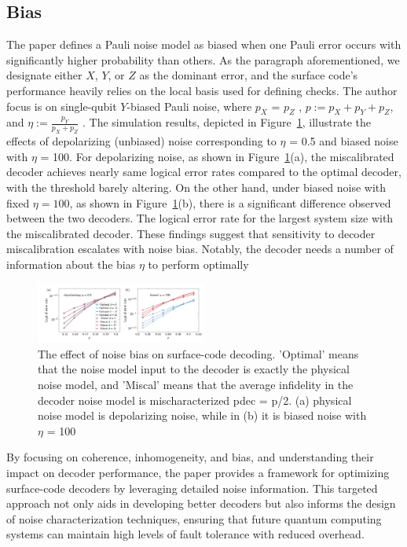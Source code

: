 \subsection{Bias}

The paper defines a Pauli noise model as biased when one Pauli error occurs with significantly higher probability than others. As the paragraph aforementioned, we designate either $X$, $Y$, or $Z$ as the dominant error, and the surface code's performance heavily relies on the local basis used for defining checks. The author focus is on single-qubit $Y$-biased Pauli noise, where $p_X$ = $p_Z$ , $p := p_X +p_Y +p_Z$, and $\eta := \frac{p_Y}{p_X + p_Z}$ . The simulation results, depicted in Figure~\ref{fig:eta}, illustrate the effects of depolarizing (unbiased) noise corresponding to $\eta$ = 0.5 and biased noise with $\eta$ = 100. For depolarizing noise, as shown in Figure~\ref{fig:eta}(a), the miscalibrated decoder achieves nearly same logical error rates compared to the optimal decoder, with the threshold barely altering. On the other hand, under biased noise with fixed $\eta = 100$, as shown in Figure~\ref{fig:eta}(b), there is a significant difference observed between the two decoders. The logical error rate for the largest system size with the miscalibrated decoder. These findings suggest that sensitivity to decoder miscalibration escalates with noise bias. Notably, the decoder needs a number of information about the bias $\eta$ to perform optimally
\begin{figure}[h]
    \centering
    \includegraphics[width=0.5\textwidth]{sections/3_decoder/eta.png}
    \caption{The effect of noise bias on surface-code decoding. 'Optimal' means that the noise model input to the decoder is exactly the physical noise model, and 'Miscal' means that the average infidelity in the decoder noise model is mischaracterized pdec = p/2. (a) physical noise model is depolarizing noise, while in (b) it is biased noise with $\eta$ = 100}
    \label{fig:eta}
\end{figure}

By focusing on coherence, inhomogeneity, and bias, and understanding their impact on decoder performance, the paper provides a framework for optimizing surface-code decoders by leveraging detailed noise information. This targeted approach not only aids in developing better decoders but also informs the design of noise characterization techniques, ensuring that future quantum computing systems can maintain high levels of fault tolerance with reduced overhead.